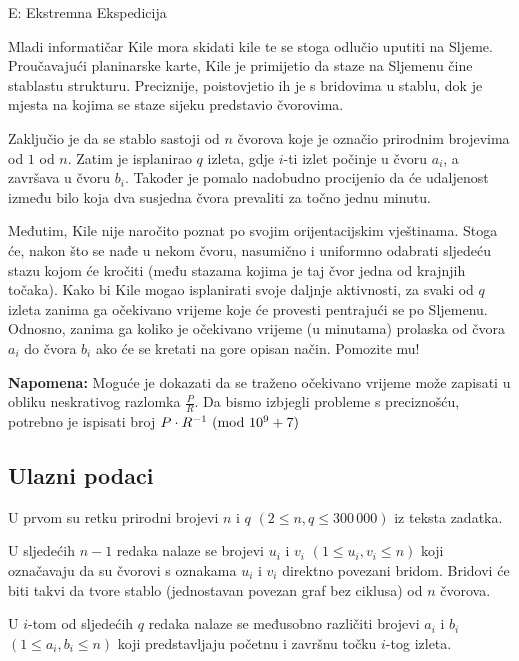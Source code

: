 \begin{statement}[
  timelimit=1 s,
  memorylimit=512 MiB,
]{E: Ekstremna Ekspedicija}

Mladi informatičar Kile mora skidati kile te se stoga odlučio uputiti na
Sljeme.  Proučavajući planinarske karte, Kile je primijetio da staze na
Sljemenu čine stablastu strukturu. Preciznije, poistovjetio ih je s bridovima u
stablu, dok je mjesta na kojima se staze sijeku predstavio čvorovima.

Zaključio je da se stablo sastoji od $n$ čvorova koje je označio prirodnim
brojevima od $1$ od $n$. Zatim je isplanirao $q$ izleta, gdje $i$-ti izlet
počinje u čvoru $a_i$, a završava u čvoru $b_i$. Također je pomalo nadobudno
procijenio da će udaljenost između bilo koja dva susjedna čvora prevaliti
za točno jednu minutu.

Međutim, Kile nije naročito poznat po svojim orijentacijskim vještinama. Stoga
će, nakon što se nađe u nekom čvoru, nasumično i uniformno odabrati sljedeću
stazu kojom će kročiti (među stazama kojima je taj čvor jedna od krajnjih
točaka). Kako bi Kile mogao isplanirati svoje daljnje aktivnosti, za svaki od
$q$ izleta zanima ga očekivano vrijeme koje će provesti pentrajući se po
Sljemenu. Odnosno, zanima ga koliko je očekivano vrijeme (u minutama)
prolaska od čvora $a_i$ do čvora $b_i$ ako će se kretati na gore opisan
način. Pomozite mu!

\textbf{Napomena:} Moguće je dokazati da se traženo očekivano vrijeme može
zapisati u obliku neskrativog razlomka $\frac{P}{R}$. Da bismo izbjegli
probleme s preciznošću, potrebno je ispisati broj $P \cdot R^{-1}
\ (\mathrm{mod}\ 10^9+7)$

\subsection*{Ulazni podaci}
U prvom su retku prirodni brojevi $n$ i $q$ $(2 \le n, q \le 300\,000)$
iz teksta zadatka.

U sljedećih $n-1$ redaka nalaze se brojevi $u_i$ i $v_i$ $(1 \le u_i, v_i \le
n)$ koji označavaju da su čvorovi s oznakama $u_i$ i $v_i$ direktno povezani
bridom.  Bridovi će biti takvi da tvore stablo (jednostavan povezan graf bez
ciklusa) od $n$ čvorova.

U $i$-tom od sljedećih $q$ redaka nalaze se međusobno različiti brojevi $a_i$ i
$b_i$ $(1 \le a_i, b_i \le n)$ koji predstavljaju početnu i završnu
točku $i$-tog izleta.


\end{statement}
